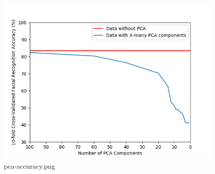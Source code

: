 \documentclass[11pt]{article}
\begin{document}
\begin{figure}[htbp]
\centering
\includegraphics{../figures/q3/pca-accuracy.png}
\caption{pca-accuracy.png}
\end{figure}
\end{document}
